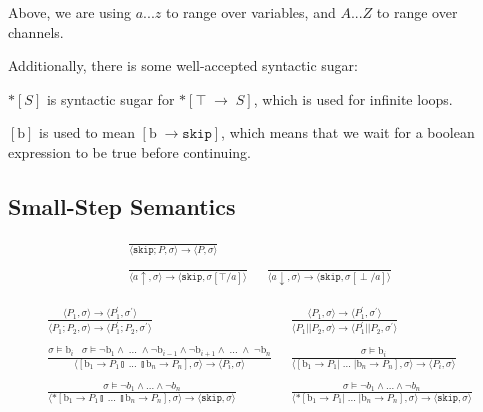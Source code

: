 \documentclass[times,10pt]{article}
\begin{document}
Above, we are using $a ... z$ to range over variables, and $A ... Z$ to range over channels.

Additionally, there is some well-accepted syntactic sugar:

$*[S]$ is syntactic sugar for $*[ \top \; \rightarrow \; S]$, which is used for infinite loops. 

$[\textrm{b}]$ is used to mean $[\textrm{b} \; \rightarrow \mathtt{skip}]$, which means that we wait for a boolean expression to be true before continuing.

\subsection{Small-Step Semantics}

\begin{align*}
\frac{}{\langle \mathtt{skip}; P, \sigma \rangle \rightarrow \langle P, \sigma \rangle } & \\ \\
\frac{}{\langle a \uparrow , \sigma\rangle \rightarrow \langle \mathtt{skip}, \sigma[\top/a]\rangle } &\;\; 
\frac{}{\langle a \downarrow , \sigma\rangle \rightarrow \langle \mathtt{skip}, \sigma[\perp/a]\rangle }
\end{align*}

\begin{align*}
\frac{\langle P_1, \sigma\rangle \rightarrow \langle P_1^\prime, \sigma^\prime\rangle }{\langle P_1; P_2, \sigma\rangle \rightarrow \langle P_1^\prime; P_2, \sigma^\prime\rangle} &
\;\; \frac{\langle P_1, \sigma\rangle \rightarrow \langle P_1^\prime, \sigma^\prime\rangle}{\langle P_1 || P_2, \sigma\rangle \rightarrow \langle P_1^\prime || P_2, \sigma^\prime\rangle} \\ \\
\frac{\sigma \models \textrm{b}_i \;\;\; \sigma \models \lnot \mathrm{b}_1 \wedge \; ... \; \wedge \lnot \mathrm{b}_{i-1} \wedge \lnot \mathrm{b}_{i+1} \wedge \; ... \; \wedge \; \lnot\mathrm{b}_n } {\langle [ \mathrm{b}_1 \rightarrow P_1  \talloblong \; ... \; \talloblong \mathrm{b}_n \rightarrow P_n ] , \sigma \rangle \rightarrow \langle P_i , \sigma\rangle  } &\;\;
 \frac{\sigma \models \textrm{b}_i} {\langle [ \mathrm{b}_1 \rightarrow P_1  | \; ... \; | \mathrm{b}_n \rightarrow P_n ] , \sigma \rangle \rightarrow \langle P_i , \sigma\rangle  } \\ \\
\frac{\sigma \models \lnot b_1 \wedge ... \wedge \lnot b_n}{\langle *[ \mathrm{b}_1 \rightarrow P_1  \talloblong \; ... \; \talloblong \mathrm{b}_n \rightarrow P_n ] , \sigma \rangle \rightarrow \langle \mathtt{skip} , \sigma\rangle } &\;\; 
\frac{\sigma \models \lnot b_1 \wedge ... \wedge \lnot b_n}{\langle *[ \mathrm{b}_1 \rightarrow P_1  | \; ... \; | \mathrm{b}_n \rightarrow P_n ] , \sigma \rangle \rightarrow \langle \mathtt{skip} , \sigma \rangle } 
\end{align*}
\end{document}
